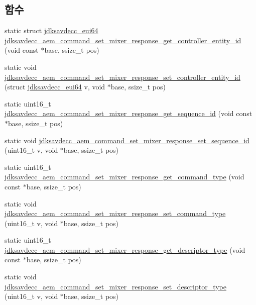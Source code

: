 \subsection*{함수}
\begin{DoxyCompactItemize}
\item 
static struct \hyperlink{structjdksavdecc__eui64}{jdksavdecc\+\_\+eui64} \hyperlink{group__command__set__mixer__response_ga017c343ef710f142e7cd940c200e62b1}{jdksavdecc\+\_\+aem\+\_\+command\+\_\+set\+\_\+mixer\+\_\+response\+\_\+get\+\_\+controller\+\_\+entity\+\_\+id} (void const $\ast$base, ssize\+\_\+t pos)
\item 
static void \hyperlink{group__command__set__mixer__response_gae7754089f8c5b4022f723857f5c854c1}{jdksavdecc\+\_\+aem\+\_\+command\+\_\+set\+\_\+mixer\+\_\+response\+\_\+set\+\_\+controller\+\_\+entity\+\_\+id} (struct \hyperlink{structjdksavdecc__eui64}{jdksavdecc\+\_\+eui64} v, void $\ast$base, ssize\+\_\+t pos)
\item 
static uint16\+\_\+t \hyperlink{group__command__set__mixer__response_ga1da8502f3861cd4ac120935fb9f43ef5}{jdksavdecc\+\_\+aem\+\_\+command\+\_\+set\+\_\+mixer\+\_\+response\+\_\+get\+\_\+sequence\+\_\+id} (void const $\ast$base, ssize\+\_\+t pos)
\item 
static void \hyperlink{group__command__set__mixer__response_ga4133ac3b655cc90d802efebf96f7aee0}{jdksavdecc\+\_\+aem\+\_\+command\+\_\+set\+\_\+mixer\+\_\+response\+\_\+set\+\_\+sequence\+\_\+id} (uint16\+\_\+t v, void $\ast$base, ssize\+\_\+t pos)
\item 
static uint16\+\_\+t \hyperlink{group__command__set__mixer__response_gabfd3ebe77009841333dc7f8ddd57ff26}{jdksavdecc\+\_\+aem\+\_\+command\+\_\+set\+\_\+mixer\+\_\+response\+\_\+get\+\_\+command\+\_\+type} (void const $\ast$base, ssize\+\_\+t pos)
\item 
static void \hyperlink{group__command__set__mixer__response_ga5d690251799b2abd994eaf4f36201f93}{jdksavdecc\+\_\+aem\+\_\+command\+\_\+set\+\_\+mixer\+\_\+response\+\_\+set\+\_\+command\+\_\+type} (uint16\+\_\+t v, void $\ast$base, ssize\+\_\+t pos)
\item 
static uint16\+\_\+t \hyperlink{group__command__set__mixer__response_gae1b7fe6fbfacd91d3cc4ca7cd99142bc}{jdksavdecc\+\_\+aem\+\_\+command\+\_\+set\+\_\+mixer\+\_\+response\+\_\+get\+\_\+descriptor\+\_\+type} (void const $\ast$base, ssize\+\_\+t pos)
\item 
static void \hyperlink{group__command__set__mixer__response_gaab927dbb453e210294aa890cd982992b}{jdksavdecc\+\_\+aem\+\_\+command\+\_\+set\+\_\+mixer\+\_\+response\+\_\+set\+\_\+descriptor\+\_\+type} (uint16\+\_\+t v, void $\ast$base, ssize\+\_\+t pos)

\end{DoxyCompactItemize}
